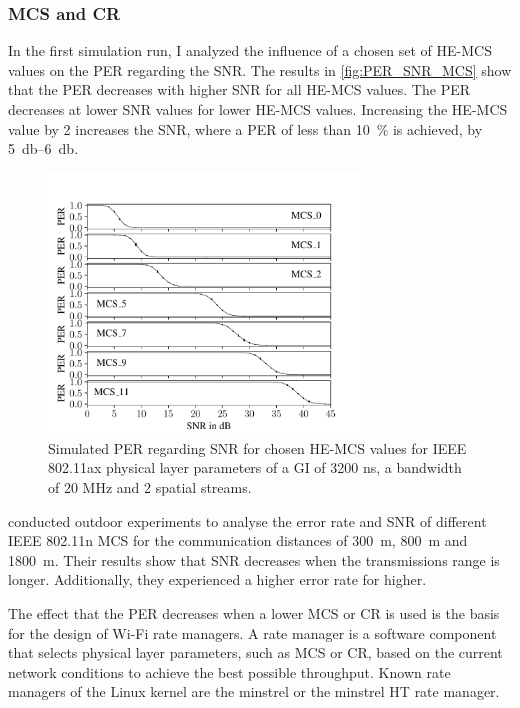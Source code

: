 \subsubsection*{\acf{MCS} and \acf{CR}}
In the first simulation run, I analyzed the influence of a chosen set of HE-MCS values on the \ac{PER} regarding the \ac{SNR}.
The results in \autoref{fig:PER_SNR_MCS} show that the \ac{PER} decreases with higher \ac{SNR} for all HE-MCS values. The
\ac{PER} decreases at lower \ac{SNR} values for lower HE-MCS values. Increasing the HE-MCS value by \num{2} increases the \ac{SNR}, where a \ac{PER} of less than
\SI{10}{\percent} is achieved, by \SIrange{5}{6}{\decibel}.
\begin{figure}[H]%
   \centering
   \includegraphics[width=0.74\textwidth]{figures/MCS_PER_to_SNR.pdf}
   \caption{Simulated PER regarding SNR for chosen HE-MCS values for IEEE 802.11ax physical layer parameters
         of a GI of 3200 ns, a bandwidth of 20 MHz and \num{2} spatial streams.}
   \label{fig:PER_SNR_MCS}%
\end{figure}
\textcite{paul_characterizing_2011} conducted outdoor experiments to analyse the error rate and \ac{SNR} of different IEEE 802.11n \ac{MCS} for the
communication distances of \SI{300}{\meter}, \SI{800}{\meter} and \SI{1800}{\meter}. Their results show that \ac{SNR} decreases when the transmissions range is longer.
Additionally, they experienced a higher error rate for higher.

The effect that the \ac{PER} decreases when a lower \ac{MCS} or \ac{CR} is used is the basis for the design of Wi-Fi rate managers.
A rate manager is a software component that selects physical layer parameters, such as \ac{MCS} or \ac{CR}, based on the current network conditions to
achieve the best possible throughput. Known rate managers of the Linux kernel are the minstrel or the minstrel HT rate manager.

